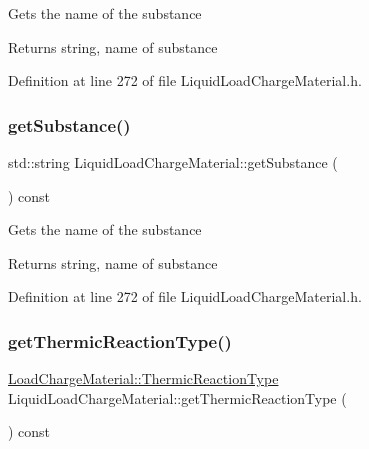 Gets the name of the substance \begin{DoxyReturn}{Returns}
string, name of substance 
\end{DoxyReturn}


Definition at line 272 of file Liquid\+Load\+Charge\+Material.\+h.

\mbox{\label{class_liquid_load_charge_material_a8f925c04c15ed889ba3fd7c4b628dbff}} 
\subsubsection{\texorpdfstring{get\+Substance()}{getSubstance()}\hspace{0.1cm}{\footnotesize\ttfamily [3/3]}}
{\footnotesize\ttfamily std\+::string Liquid\+Load\+Charge\+Material\+::get\+Substance (\begin{DoxyParamCaption}{ }\end{DoxyParamCaption}) const\hspace{0.3cm}{\ttfamily [inline]}}

Gets the name of the substance \begin{DoxyReturn}{Returns}
string, name of substance 
\end{DoxyReturn}


Definition at line 272 of file Liquid\+Load\+Charge\+Material.\+h.

\mbox{\label{class_liquid_load_charge_material_a181337f5e5cf6a47b82dd56897b49c29}} 
\subsubsection{\texorpdfstring{get\+Thermic\+Reaction\+Type()}{getThermicReactionType()}\hspace{0.1cm}{\footnotesize\ttfamily [1/3]}}
{\footnotesize\ttfamily \hyperlink{class_load_charge_material_a51d4263e865a5d86236622dd3fe23fd1}{Load\+Charge\+Material\+::\+Thermic\+Reaction\+Type} Liquid\+Load\+Charge\+Material\+::get\+Thermic\+Reaction\+Type (\begin{DoxyParamCaption}{ }\end{DoxyParamCaption}) const\hspace{0.3cm}{\ttfamily [inline]}}

